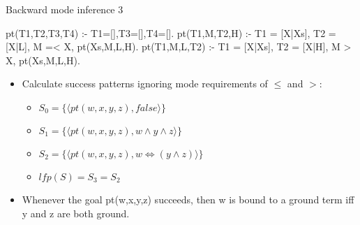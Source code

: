 \documentclass{beamer}
\begin{document}
\begin{frame}[fragile]{Backward mode inference 3}
\vspace{\fill}

\begin{minipage}[t]{.35\textwidth}
\begin{semiverbatim}
pt(T1,T2,T3,T4) :-
     T1=[],T3=[],T4=[].
pt(T1,M,T2,H) :-
     T1 = [X|Xs],
     T2 = [X|L],
     M =< X,
     pt(Xs,M,L,H).
pt(T1,M,L,T2) :-
     T1 = [X|Xs],
     T2 = [X|H],
     M > X,
     pt(Xs,M,L,H).
\end{semiverbatim}
\end{minipage} \hspace{\fill}
\begin{minipage}[t]{.55\textwidth}
\begin{itemize}
    \item Calculate success patterns ignoring mode requirements of $\leq$ and $>$:
    \begin{itemize} \small
        \item \(S_0 = \{\langle pt(w,x,y,z), false\rangle\}\)
        \item \(S_1 = \{\langle pt(w,x,y,z), w\wedge y\wedge z\rangle\}\)
        \item \(S_2 = \{\langle pt(w,x,y,z), w\Leftrightarrow(y\wedge z)\rangle\}\)
        \item \(lfp(S) = S_3 = S_2\)
    \end{itemize}
    \item Whenever the goal pt(w,x,y,z) succeeds,
        then w is bound to a ground term iff y and z are both
        ground.
\end{itemize}

\end{minipage}



\vspace{\fill}

\end{frame}
\end{document}
